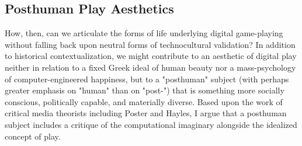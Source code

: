 \subsection*{Posthuman Play Aesthetics}
How, then, can we articulate the forms of life underlying digital game-playing without falling back upon neutral forms of technocultural validation? In addition to historical contextualization, we might contribute to an aesthetic of digital play neither in relation to a fixed Greek ideal of human beauty nor a mass-psychology of computer-engineered happiness, but to a "posthuman" subject (with perhaps greater emphasis on "human" than on "post-") that is something more socially conscious, politically capable, and materially diverse. Based upon the work of critical media theorists including Poster and Hayles, I argue that a posthuman subject includes a critique of the computational imaginary alongside the idealized concept of play.

